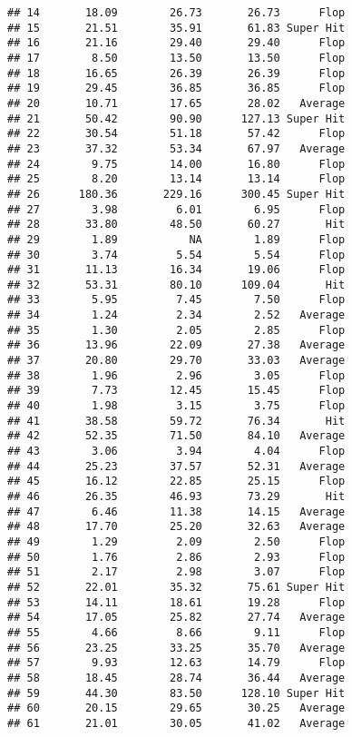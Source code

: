 \documentclass[
]{article}
\begin{document}
\begin{verbatim}
## 14       18.09        26.73       26.73      Flop
## 15       21.51        35.91       61.83 Super Hit
## 16       21.16        29.40       29.40      Flop
## 17        8.50        13.50       13.50      Flop
## 18       16.65        26.39       26.39      Flop
## 19       29.45        36.85       36.85      Flop
## 20       10.71        17.65       28.02   Average
## 21       50.42        90.90      127.13 Super Hit
## 22       30.54        51.18       57.42      Flop
## 23       37.32        53.34       67.97   Average
## 24        9.75        14.00       16.80      Flop
## 25        8.20        13.14       13.14      Flop
## 26      180.36       229.16      300.45 Super Hit
## 27        3.98         6.01        6.95      Flop
## 28       33.80        48.50       60.27       Hit
## 29        1.89           NA        1.89      Flop
## 30        3.74         5.54        5.54      Flop
## 31       11.13        16.34       19.06      Flop
## 32       53.31        80.10      109.04       Hit
## 33        5.95         7.45        7.50      Flop
## 34        1.24         2.34        2.52   Average
## 35        1.30         2.05        2.85      Flop
## 36       13.96        22.09       27.38   Average
## 37       20.80        29.70       33.03   Average
## 38        1.96         2.96        3.05      Flop
## 39        7.73        12.45       15.45      Flop
## 40        1.98         3.15        3.75      Flop
## 41       38.58        59.72       76.34       Hit
## 42       52.35        71.50       84.10   Average
## 43        3.06         3.94        4.04      Flop
## 44       25.23        37.57       52.31   Average
## 45       16.12        22.85       25.15      Flop
## 46       26.35        46.93       73.29       Hit
## 47        6.46        11.38       14.15   Average
## 48       17.70        25.20       32.63   Average
## 49        1.29         2.09        2.50      Flop
## 50        1.76         2.86        2.93      Flop
## 51        2.17         2.98        3.07      Flop
## 52       22.01        35.32       75.61 Super Hit
## 53       14.11        18.61       19.28      Flop
## 54       17.05        25.82       27.74   Average
## 55        4.66         8.66        9.11      Flop
## 56       23.25        33.25       35.70   Average
## 57        9.93        12.63       14.79      Flop
## 58       18.45        28.74       36.44   Average
## 59       44.30        83.50      128.10 Super Hit
## 60       20.15        29.65       30.25   Average
## 61       21.01        30.05       41.02   Average
\end{verbatim}
\end{document}
